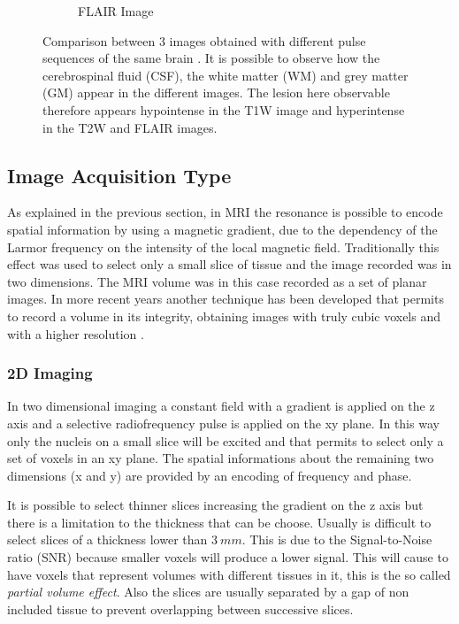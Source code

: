 \documentclass{standalone}
\begin{document}
\begin{figure}[h!]
\begin{subfigure}[b]{0.325\textwidth}
             \caption{FLAIR Image}
             \label{fig:FLAIR_example}
        \end{subfigure}
		\caption{Comparison between 3 images obtained with different pulse sequences of the same brain \cite{IMG:PulseSequences}. It is possible to observe how the cerebrospinal fluid (CSF), the white matter (WM) and grey matter (GM) appear in the different images. The lesion here observable therefore appears hypointense in the T1W image and hyperintense in the T2W and FLAIR images.}
		\label{fig:Modality_comparison}
	\end{figure} 

\subsection{Image Acquisition Type}
As explained in the previous section, in MRI the resonance is possible to encode spatial information by using a magnetic gradient, due to the dependency of the Larmor frequency on the intensity of the local magnetic field.
Traditionally this effect was used to select only a small slice of tissue and the image recorded was in two dimensions.
The MRI volume was in this case recorded as a set of planar images.
In more recent years another technique has been developed that permits to record a volume in its integrity, obtaining images with truly cubic voxels and with a higher resolution \cite{ART:Martì}.

\subsubsection{2D Imaging}
In two dimensional imaging a constant field with a gradient is applied on the z axis and a selective radiofrequency pulse is applied on the xy plane. In this way only the nucleis on a small slice will be excited and that permits to select only a set of voxels in an xy plane.
The spatial informations about the remaining two dimensions (x and y) are provided by an encoding of frequency and phase.

It is possible to select thinner slices increasing the gradient on the z axis but there is a limitation to the thickness that can be choose. Usually is difficult to select slices of a thickness lower than $3\ mm$. This is due to the Signal-to-Noise ratio (SNR) because smaller voxels will produce a lower signal. 
This will cause to have voxels that represent volumes with different tissues in it, this is the so called \textit{partial volume effect}.
Also the slices are usually separated by a gap of non included tissue to prevent overlapping between successive slices.
\end{document}
